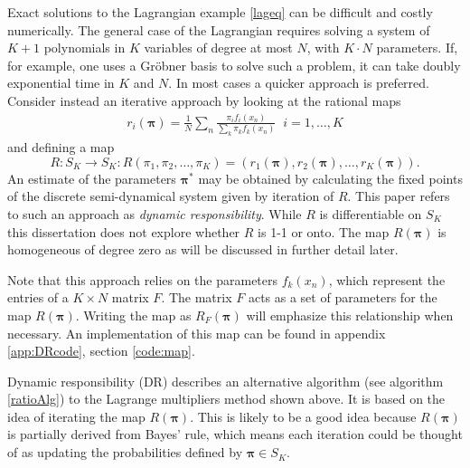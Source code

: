 Exact solutions to the Lagrangian example \ref{lageq} can be difficult and costly numerically.  The general case of the Lagrangian requires solving a system of $K+1$ polynomials in $K$ variables of degree at most $N$, with $K\cdot N$ parameters.  If, for example, one uses a Gr\"obner basis to solve such a problem, it can take doubly exponential time in $K$ and $N$.  In most cases a quicker approach is preferred. \\

Consider instead an iterative approach by looking at the rational maps
\begin{align*}
r_i(\bm\pi)=\frac 1N\sum_n \frac{\pi_i f_i(x_n)}{\sum_{k}\pi_{k}f_{k}(x_n)}\;\; i=1,\ldots,K
\end{align*}
and defining a map 
\begin{equation}\label{map}
R:S_K\rightarrow S_K: R(\pi_1,\pi_2,\ldots,\pi_K)=(r_1(\bm\pi),r_2(\bm\pi),\ldots,r_K(\bm\pi)).
\end{equation}
An estimate of the parameters \( \bm\pi^{\ast} \) may be obtained by calculating the fixed points of the discrete semi-dynamical system given by iteration of \( R \). This paper refers to such an approach as \textit{dynamic responsibility}. While \( R \) is differentiable on \( S_K \) this dissertation does not explore whether \( R \) is 1-1 or onto. The map $R(\bm\pi)$ is homogeneous of degree zero as will be discussed in further detail later.

Note that this approach relies on the parameters $f_k(x_n)$, which represent the entries of a $K\times N$ matrix $F$. The matrix $F$ acts as a set of parameters for the map $R(\bm\pi)$. Writing the map as $R_F(\bm\pi)$ will emphasize this relationship when necessary. An implementation of this map can be found in appendix \ref{app:DRcode}, section \ref{code:map}.

Dynamic responsibility (DR) describes an alternative algorithm (see algorithm \ref{ratioAlg}) to the Lagrange multipliers method shown above.  It is based on the idea of iterating the map $R(\bm\pi)$. This is likely to be a good idea because $R(\bm\pi)$ is partially derived from Bayes' rule, which means each iteration could be thought of as updating the probabilities defined by $\bm\pi\in S_K$.  

